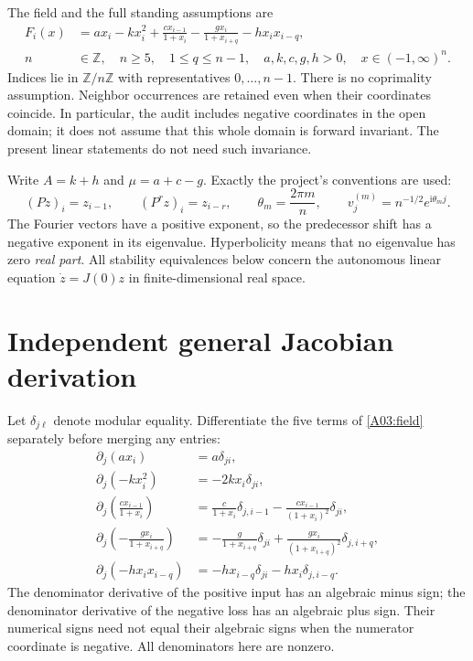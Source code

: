 \documentclass[11pt]{article}
\newcommand{\ZZ}{\mathbb Z}
\newcommand{\Dom}{(-1,\infty)^n}
\begin{document}
The field and the full standing assumptions are
\begin{align}
 F_i(x)&=a x_i-kx_i^2+\frac{c x_{i-1}}{1+x_i}
             -\frac{g x_i}{1+x_{i+q}}-h x_i x_{i-q},\label{A03:field}\\
 n&\in\ZZ,\quad n\ge5,\quad 1\le q\le n-1,\quad
 a,k,c,g,h>0,\quad x\in\Dom.\label{A03:assumptions}
\end{align}
Indices lie in $\ZZ/n\ZZ$ with representatives $0,\ldots,n-1$.
There is no coprimality assumption. Neighbor occurrences are retained even
when their coordinates coincide. In particular, the audit includes negative
coordinates in the open domain; it does not assume that this whole domain is
forward invariant. The present linear statements do not need such invariance.

Write $A=k+h$ and $\mu=a+c-g$. Exactly the project's conventions are used:
\[
 (Pz)_i=z_{i-1},\qquad (P^r z)_i=z_{i-r},\qquad
 \theta_m=\frac{2\pi m}{n},\qquad
 v^{(m)}_j=n^{-1/2}e^{\mathrm i\theta_m j}.
\]
The Fourier vectors have a positive exponent, so the predecessor shift has
a negative exponent in its eigenvalue. Hyperbolicity means that no eigenvalue
has zero \emph{real part}. All stability equivalences below concern the
autonomous linear equation $\dot z=J(0)z$ in finite-dimensional real space.

\section{Independent general Jacobian derivation}
Let $\delta_{j\ell}$ denote modular equality. Differentiate the five terms of
\eqref{A03:field} separately before merging any entries:
\begin{align*}
 \partial_j(a x_i)&=a\delta_{ji},\\
 \partial_j(-k x_i^2)&=-2kx_i\delta_{ji},\\
 \partial_j\!\left(\frac{c x_{i-1}}{1+x_i}\right)
 &=\frac{c}{1+x_i}\delta_{j,i-1}
    -\frac{c x_{i-1}}{(1+x_i)^2}\delta_{ji},\\
 \partial_j\!\left(-\frac{g x_i}{1+x_{i+q}}\right)
 &=-\frac{g}{1+x_{i+q}}\delta_{ji}
    +\frac{g x_i}{(1+x_{i+q})^2}\delta_{j,i+q},\\
 \partial_j(-h x_i x_{i-q})
 &=-h x_{i-q}\delta_{ji}-h x_i\delta_{j,i-q}.
\end{align*}
The denominator derivative of the positive input has an algebraic minus
sign; the denominator derivative of the negative loss has an algebraic plus
sign. Their numerical signs need not equal their algebraic signs when the
numerator coordinate is negative. All denominators here are nonzero.
\end{document}
